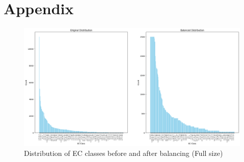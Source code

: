 \section*{Appendix}

\appendixlist


\begin{figure}[hbt]
    \centering
    \begin{minipage}[t]{\textwidth}
    \caption{Distribution of EC classes before and after balancing (Full size)}
    \includegraphics[width=1\textwidth]{img/ec-distribution-comparison.png}
    \end{minipage}
\end{figure}

\pagebreak


